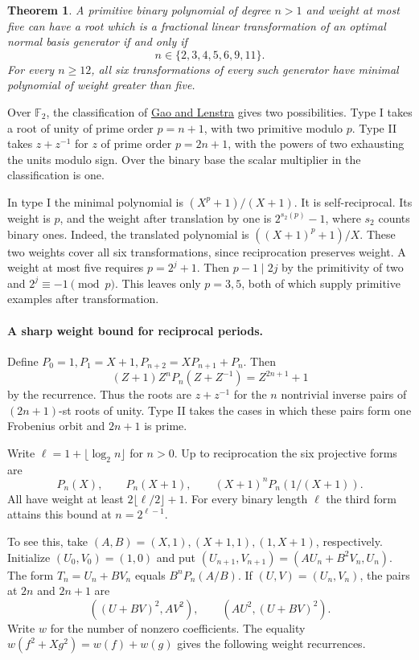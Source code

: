 \documentclass[11pt]{article}
\newtheorem{theorem}{Theorem}
\begin{document}
\begin{theorem}
A primitive binary polynomial of degree \(n>1\) and weight at most
five can have a root which is a fractional linear transformation of
an optimal normal basis generator if and only if
\[
                     n\in\{2,3,4,5,6,9,11\}.
\]
For every \(n\ge12\), all six transformations of every such generator
have minimal polynomial of weight greater than five.
\end{theorem}

Over \(\mathbb F_2\), the classification of
\href{https://pub.math.leidenuniv.nl/~lenstrahw/PUBLICATIONS/1992e/art.pdf}
{Gao and Lenstra} gives two possibilities. Type I takes a root of unity
of prime order \(p=n+1\), with two primitive modulo \(p\). Type II
takes \(z+z^{-1}\) for \(z\) of prime order \(p=2n+1\), with the
powers of two exhausting the units modulo sign. Over the binary base
the scalar multiplier in the classification is one.

In type I the minimal polynomial is \((X^p+1)/(X+1)\). It is
self-reciprocal. Its weight is \(p\), and the weight after translation
by one is \(2^{s_2(p)}-1\), where \(s_2\) counts binary ones.
Indeed, the translated polynomial is \(((X+1)^p+1)/X\). These two
weights cover all six transformations, since reciprocation preserves
weight. A weight at most five requires \(p=2^j+1\). Then
\(p-1\mid 2j\) by the primitivity of two and
\(2^j\equiv-1\pmod p\). This leaves only \(p=3,5\), both of which
supply primitive examples after transformation.

\paragraph{A sharp weight bound for reciprocal periods.}
Define \(P_0=1, P_1=X+1, P_{n+2}=XP_{n+1}+P_n\). Then
\[
       (Z+1)Z^n P_n(Z+Z^{-1})=Z^{2n+1}+1
\]
by the recurrence. Thus the roots are \(z+z^{-1}\) for the \(n\)
nontrivial inverse pairs of \((2n+1)\)-st roots of unity. Type II
takes the cases in which these pairs form one Frobenius orbit
and \(2n+1\) is prime.

Write \(\ell=1+\lfloor\log_2 n\rfloor\) for \(n>0\). Up to
reciprocation the six projective forms are
\[
 P_n(X),\qquad P_n(X+1),\qquad (X+1)^nP_n(1/(X+1)).
\]
All have weight at least \(2\lfloor\ell/2\rfloor+1\).
For every binary length \(\ell\) the third form attains this bound at
\(n=2^{\ell-1}\).

To see this, take \((A,B)=(X,1),(X+1,1),(1,X+1)\), respectively.
Initialize \((U_0,V_0)=(1,0)\) and put
\((U_{n+1},V_{n+1})=(AU_n+B^2 V_n,U_n)\).
The form \(T_n=U_n+BV_n\) equals \(B^nP_n(A/B)\).
If \((U,V)=(U_n,V_n)\), the pairs at \(2n\) and \(2n+1\) are
\[
 ((U+BV)^2,AV^2),\qquad (AU^2,(U+BV)^2).
\]
Write \(w\) for the number of nonzero coefficients. The equality
\(w(f^2+Xg^2)=w(f)+w(g)\) gives the following weight recurrences.
\end{document}
